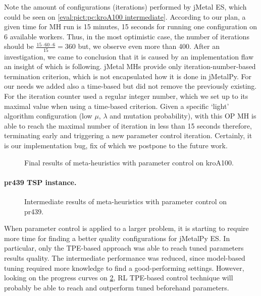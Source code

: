 Note the amount of configurations (iterations) performed by jMetal ES, which could be seen on \cref{eval:pict:pc:kroA100 intermediate}. According to our plan, a given time for MH run is 15 minutes, 15 seconds for running one configuration on 6 available workers. Thus, in the most optimistic case, the number of iterations should be $ \frac{15\cdot60\cdot6}{15} = 360$ but, we observe even more than 400. After an investigation, we came to conclusion that it is caused by an implementation flaw an insight of which is following. jMetal MHs provide only iteration-number-based termination criterion, which is not encapsulated how it is done in jMetalPy. For our needs we added also a time-based but did not remove the previously existing. For the iteration counter used a regular integer number, which we set up to its maximal value when using a time-based criterion. Given a specific `light' algorithm configuration (low $\mu$, $\lambda$ and mutation probability), with this OP MH is able to reach the maximal number of iteration in less than 15 seconds therefore, terminating early and triggering a new parameter control iteration. Certainly, it is our implementation bug, fix of which we postpone to the future work.


\begin{figure}[b]
	\centering
	
	\caption{Final results of meta-heuristics with parameter control on kroA100.}
	\label{eval:pict:pc:kroA100 final}
\end{figure}

\newpage
\paragraph{pr439 TSP instance.}
\begin{figure}[t]
	\centering
	
	\caption{Intermediate results of meta-heuristics with parameter control on pr439.}
	\label{eval:pict:pc:pr439 intermediate}
\end{figure}

When parameter control is applied to a larger problem, it is starting to require more time for finding a better quality configurations for jMetalPy ES. In particular, only the TPE-based approach was able to reach tuned parameters results quality. The intermediate performance was reduced, since model-based tuning required more knowledge to find a good-performing settings. However, looking on the progress curves on \cref{eval:pict:pc:pr439 intermediate}, RL TPE-based control technique will probably be able to reach and outperform tuned beforehand parameters.

